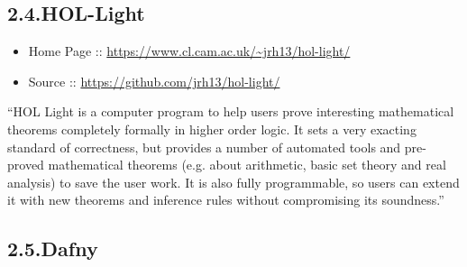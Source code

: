 \documentclass[12pt,twoside]{article}
\begin{document}
\subsection{2.4.\hspace*{0.5em}HOL-Light}\label{sec-hol-light}%

\begin{itemize}[noitemsep,topsep=\mdcompacttopsep]%

\item{}Home Page :: \href{https://www.cl.cam.ac.uk/~jrh13/hol-light/}{{\ttfamily https://\hspace{0pt}www.\hspace{0pt}cl.\hspace{0pt}cam.\hspace{0pt}ac.\hspace{0pt}uk/\hspace{0pt}\textasciitilde{}jrh13/\hspace{0pt}hol-\hspace{0pt}light/\hspace{0pt}}}%

\item{}Source :: \href{https://github.com/jrh13/hol-light/}{{\ttfamily https://\hspace{0pt}github.\hspace{0pt}com/\hspace{0pt}jrh13/\hspace{0pt}hol-\hspace{0pt}light/\hspace{0pt}}}%
\end{itemize}%

\noindent{}\textquotedblleft{}HOL Light is a computer program to help users prove interesting
mathematical theorems completely formally in higher order logic. It
sets a very exacting standard of correctness, but provides a number of
automated tools and pre-proved mathematical theorems (e.g. about
arithmetic, basic set theory and real analysis) to save the user
work. It is also fully programmable, so users can extend it with new
theorems and inference rules without compromising its soundness.\textquotedblright{}%

\subsection{2.5.\hspace*{0.5em}Dafny}\label{sec-dafny}%
\end{document}
